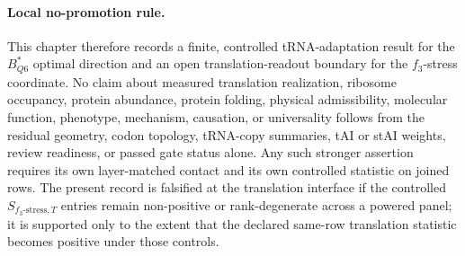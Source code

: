 \paragraph{Local no-promotion rule.}
This chapter therefore records a finite, controlled tRNA-adaptation result for the $B^*_{Q6}$ optimal direction and an open translation-readout boundary for the $f_3$-stress coordinate. No claim about measured translation realization, ribosome occupancy, protein abundance, protein folding, physical admissibility, molecular function, phenotype, mechanism, causation, or universality follows from the residual geometry, codon topology, tRNA-copy summaries, tAI or stAI weights, review readiness, or passed gate status alone. Any such stronger assertion requires its own layer-matched contact and its own controlled statistic on joined rows. The present record is falsified at the translation interface if the controlled $S_{f_3\text{-stress},T}$ entries remain non-positive or rank-degenerate across a powered panel; it is supported only to the extent that the declared same-row translation statistic becomes positive under those controls.